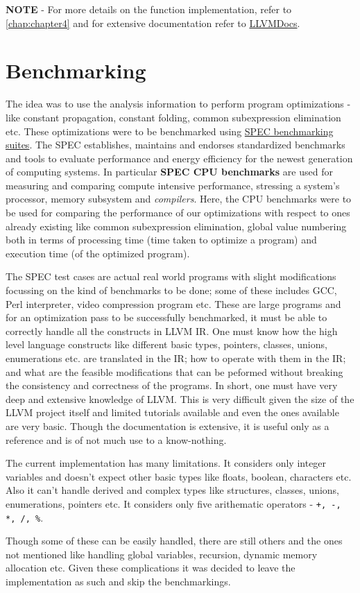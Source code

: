 \bigskip \noindent \textbf{NOTE} - For more details on the function implementation, refer to \autoref{chap:chapter4} and for extensive documentation refer to \href{https://himanshu520.github.io/HerbrandEquivalenceLLVMDocs/}{LLVMDocs}.

\section{Benchmarking}
\label{sec:Benchmarking}

The idea was to use the analysis information to perform program optimizations - like constant propagation, constant folding, common subexpression elimination etc. These optimizations were to be benchmarked using \href{https://www.spec.org/}{SPEC benchmarking suites}. The SPEC establishes, maintains and endorses standardized benchmarks and tools to evaluate performance and energy efficiency for the newest generation of computing systems. In particular \textbf{SPEC CPU benchmarks} are used for measuring and comparing compute intensive performance, stressing a system's processor, memory subsystem and \textit{compilers}. Here, the CPU benchmarks were to be used for comparing the performance of our optimizations with respect to ones already existing like common subexpression elimination, global value numbering both in terms of processing time (time taken to optimize a program) and execution time (of the optimized program).

The SPEC test cases are actual real world programs with slight modifications focussing on the kind of benchmarks to be done; some of these includes GCC, Perl interpreter, video compression program etc. These are large programs and for an optimization pass to be successfully benchmarked, it must be able to correctly handle all the constructs in LLVM IR. One must know how the high level language constructs like different basic types, pointers, classes, unions, enumerations etc. are translated in the IR; how to operate with them in the IR; and what are the feasible modifications that can be peformed without breaking the consistency and correctness of the programs. In short, one must have very deep and extensive knowledge of LLVM. This is very difficult given the size of the LLVM project itself and limited tutorials available and even the ones available are very basic. Though the documentation is extensive, it is useful only as a reference and is of not much use to a know-nothing.

The current implementation has many limitations. It considers only integer variables and doesn't expect other basic types like floats, boolean, characters etc. Also it can't handle derived and complex types like structures, classes, unions, enumerations, pointers etc. It considers only five arithematic operators - \texttt{+, -, *, /, \%}.

Though some of these can be easily handled, there are still others and the ones not mentioned like handling global variables, recursion, dynamic memory allocation etc. Given these complications it was decided to leave the implementation as such and skip the benchmarkings.
